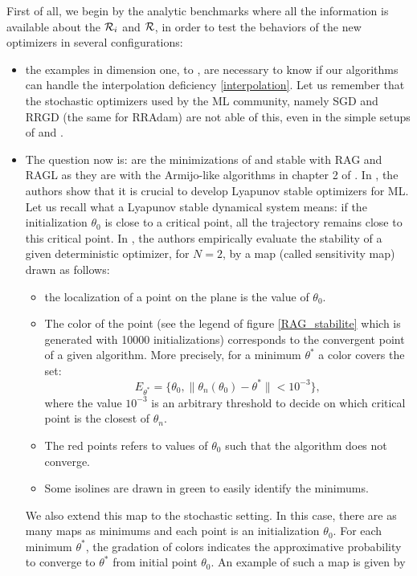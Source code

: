 First of all, we begin by the analytic benchmarks where all the information is available about the $\mathcal{R}_i$ and $\mathcal{R}$, in order to test the behaviors of the new optimizers in several configurations:
\begin{itemize}
	\item the examples in dimension one, \exOne to \exHeight, are necessary to know if our algorithms can handle the interpolation deficiency \eqref{interpolation}. Let us remember that the stochastic optimizers used by the ML community, namely SGD and RRGD (the same for RRAdam) are not able of this, even in the simple setups of \exOne and \exTwo. 
	\item The question now is: are the minimizations of \polyTwo and \polyThree stable with RAG and RAGL as they are with the Armijo-like algorithms in chapter 2 of \cite{Bilel_thesis}. In \cite{Bilel}, the authors show that it is crucial to develop Lyapunov stable optimizers for ML. Let us recall what a Lyapunov stable dynamical system means: if the initialization $\theta_0$ is close to a critical point, all the trajectory remains close to this critical point. In \cite{Bilel}, the authors empirically evaluate the stability of a given deterministic optimizer, for $N=2$, by a map (called sensitivity map) drawn as follows:
	\begin{itemize}
		\item the localization of a point on the plane is the value of $\theta_0$.
		\item The color of the point (see the legend of figure \ref{RAG_stabilite} which is generated with 10000 initializations) corresponds to the convergent point of a given algorithm. More precisely, for a minimum $\theta^*$ a color covers the set:
		\begin{equation*}
			E_{\theta^*} = \{ \theta_0, \|\theta_n(\theta_0)-\theta^*\| < 10^{-3} \},
		\end{equation*}
		where the value $10^{-3}$ is an arbitrary threshold to decide on which critical point is the closest of $\theta_n$.
		\item The red points refers to values of $\theta_0$ such that the algorithm does not converge.
		\item Some isolines are drawn in green to easily identify the minimums.
	\end{itemize}
	We also extend this map to the stochastic setting. In this case, there are as many maps as minimums and each point is an initialization $\theta_0$. For each minimum
        $\theta^*$, the gradation of colors indicates the approximative probability to converge to $\theta^*$ from initial point $\theta_0$. An example of such a map is given by

\end{itemize}

